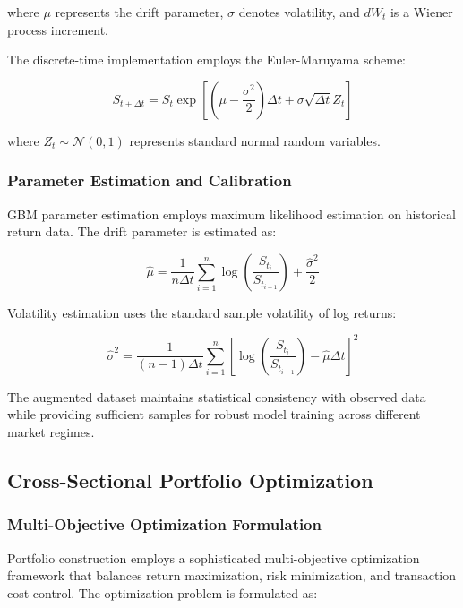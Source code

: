 \documentclass[conference]{IEEEtran}
\begin{document}
where $\mu$ represents the drift parameter, $\sigma$ denotes volatility, and $dW_t$ is a Wiener process increment.

The discrete-time implementation employs the Euler-Maruyama scheme:

\begin{equation}
S_{t+\Delta t} = S_t \exp\left[\left(\mu - \frac{\sigma^2}{2}\right)\Delta t + \sigma \sqrt{\Delta t} Z_t\right]
\end{equation}

where $Z_t \sim \mathcal{N}(0,1)$ represents standard normal random variables.

\subsubsection{Parameter Estimation and Calibration}

GBM parameter estimation employs maximum likelihood estimation on historical return data. The drift parameter is estimated as:

\begin{equation}
\hat{\mu} = \frac{1}{n\Delta t} \sum_{i=1}^n \log\left(\frac{S_{t_i}}{S_{t_{i-1}}}\right) + \frac{\hat{\sigma}^2}{2}
\end{equation}

Volatility estimation uses the standard sample volatility of log returns:

\begin{equation}
\hat{\sigma}^2 = \frac{1}{(n-1)\Delta t} \sum_{i=1}^n \left[\log\left(\frac{S_{t_i}}{S_{t_{i-1}}}\right) - \hat{\mu}\Delta t\right]^2
\end{equation}

The augmented dataset maintains statistical consistency with observed data while providing sufficient samples for robust model training across different market regimes.

\subsection{Cross-Sectional Portfolio Optimization}

\subsubsection{Multi-Objective Optimization Formulation}

Portfolio construction employs a sophisticated multi-objective optimization framework that balances return maximization, risk minimization, and transaction cost control. The optimization problem is formulated as:
\end{document}
